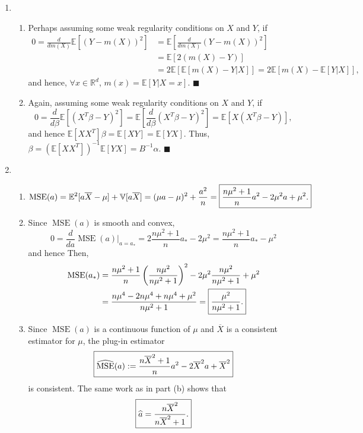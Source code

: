 \documentclass[11pt]{article}
\renewcommand{\qed}{\quad \ensuremath{\blacksquare}}
\newcommand{\inv}{^{-1}}
\newcommand{\E}{\mathbb{E}} %
\newcommand{\Var}{\mathbb{V}} %
\newcommand{\R}{\mathbb{R}} %
\newcommand{\ol}{\overline}
\newcommand{\MSE}{\operatorname{MSE}} %
\begin{document}
\begin{enumerate}
\item
\begin{enumerate}
\item Perhaps assuming some weak regularity conditions on $X$ and $Y$, if
\begin{align*}
0
    = \frac{d}{dm(X)} \E[(Y - m(X))^2]
 &  = \E\left[ \frac{d}{dm(X)} (Y - m(X))^2 \right] \\
 &  = \E\left[ 2(m(X) - Y) \right]  \\
 &  = 2\E\left[ \E[m(X) - Y | X] \right]
    = 2\E\left[ m(X) - \E[Y | X] \right],
\end{align*}
and hence, $\forall x \in \R^d$, $m(x) = \E[Y | X = x]$. \qed

\item Again, assuming some weak regularity conditions on $X$ and $Y$, if
\[0
    = \frac{d}{d\beta} \E[(X^T\beta - Y)^2]
    = \E[\frac{d}{d\beta} (X^T\beta - Y)^2]
    = \E[X(X^T\beta - Y)],\]
and hence $\E[XX^T]\beta = \E[XY] = \E[YX]$. Thus,
$\beta = (\E[XX^T])\inv \E[YX] = B\inv \alpha$. \qed

\end{enumerate}

\item
\begin{enumerate}
\item
\[\MSE(a)
    = \E^2[a\ol X - \mu] + \Var[a\ol X]
    = (\mu a - \mu)^2 + \frac{a^2}{n}
    = \mbox{\fbox{$\displaystyle \frac{n\mu^2 + 1}{n}a^2 - 2\mu^2 a + \mu^2$.}}
\]

\item Since $\MSE(a)$ is smooth and convex,
\[0
    = \frac{d}{da} \MSE(a) \bigg|_{a = a_*}
    = 2\frac{n\mu^2 + 1}{n}a_* - 2\mu^2
    = \frac{n\mu^2 + 1}{n}a_* - \mu^2
\]
and hence  Then,
\begin{align*}
\MSE(a_*)
 &  = \frac{n\mu^2 + 1}{n}\left( \frac{n\mu^2}{n\mu^2 + 1} \right)^2
    - 2\mu^2 \frac{n\mu^2}{n\mu^2 + 1} + \mu^2  \\
 &  = \frac{n\mu^4 - 2n\mu^4 + n\mu^4 + \mu^2}{n\mu^2 + 1}
    = \mbox{\fbox{$\displaystyle \frac{\mu^2}{n\mu^2 + 1}$.}}
\end{align*}

\item Since $\MSE(a)$ is a continuous function of $\mu$ and $\ol X$ is a
consistent estimator for $\mu$, the plug-in estimator
\[\mbox{\fbox{$\displaystyle
    \widehat{\MSE}(a) := \frac{n\ol X^2 + 1}{n}a^2 - 2\ol X^2 a + \ol X^2$}}\]
is consistent. The same work as in part (b) shows that
\[\mbox{\fbox{$\displaystyle \widehat a = \frac{n\ol X^2}{n\ol X^2 + 1}$.}}\]


\end{enumerate}
\end{enumerate}
\end{document}
